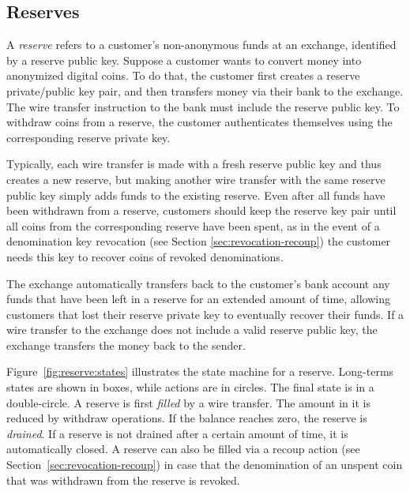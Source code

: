 
\subsection{Reserves}

A \emph{reserve} refers to a customer's non-anonymous funds at an exchange,
identified by a reserve public key.  Suppose a customer wants to convert money
into anonymized digital coins.  To do that, the customer first creates a
reserve private/public key pair, and then transfers money via their bank to the
exchange.  The wire transfer instruction to the bank must include the reserve
public key.  To withdraw coins from a reserve, the customer authenticates
themselves using the corresponding reserve private key.

Typically, each wire transfer is made with a fresh reserve public key and thus
creates a new reserve, but making another wire transfer with the same reserve
public key simply adds funds to the existing reserve.  Even after all funds
have been withdrawn from a reserve, customers should keep the reserve key pair
until all coins from the corresponding reserve have been spent, as in the event
of a denomination key revocation (see Section \ref{sec:revocation-recoup}) the
customer needs this key to recover coins of revoked denominations.

The exchange automatically transfers back to the customer's bank account any
funds that have been left in a reserve for an extended amount of time, allowing
customers that lost their reserve private key to eventually recover their
funds.  If a wire transfer to the exchange does not include a valid reserve public key,
the exchange transfers the money back to the sender.

Figure~\ref{fig:reserve:states} illustrates the state machine for a reserve.
Long-terms states are shown in boxes, while actions are in circles.  The final
state is in a double-circle.  A reserve is first {\em filled} by a wire
transfer. The amount in it is reduced by withdraw operations. If the balance
reaches zero, the reserve is {\em drained}. If a reserve is not drained after
a certain amount of time, it is automatically closed.  A reserve can also be
filled via a recoup action (see Section~\ref{sec:revocation-recoup}) in case
that the denomination of an unspent coin that was withdrawn from the reserve
is revoked.

